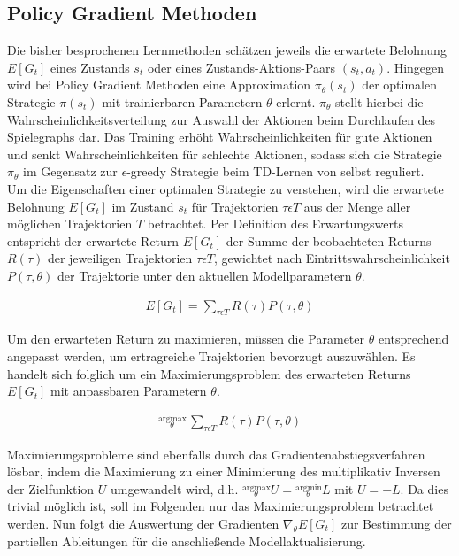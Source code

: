 \subsection{Policy Gradient Methoden}
Die bisher besprochenen Lernmethoden schätzen jeweils die erwartete Belohnung $E[G_t]$
eines Zustands $s_t$ oder eines Zustands-Aktions-Paars $(s_t, a_t)$. Hingegen wird bei
Policy Gradient Methoden eine Approximation $\pi_\theta(s_t)$ der optimalen Strategie
$\pi(s_t)$ mit trainierbaren Parametern $\theta$ erlernt. $\pi_\theta$ stellt hierbei
die Wahrscheinlichkeitsverteilung zur Auswahl der Aktionen beim Durchlaufen des
Spielegraphs dar. Das Training erhöht Wahrscheinlichkeiten für gute Aktionen und
senkt Wahrscheinlichkeiten für schlechte Aktionen, sodass sich die Strategie $\pi_\theta$
im Gegensatz zur $\epsilon$-greedy Strategie beim TD-Lernen von selbst reguliert.\\

Um die Eigenschaften einer optimalen Strategie zu verstehen, wird die erwartete
Belohnung $E[G_t]$ im Zustand $s_t$ für Trajektorien $\tau \epsilon T$ aus der Menge
aller möglichen Trajektorien $T$ betrachtet. Per Definition des Erwartungswerts
entspricht der erwartete Return $E[G_t]$ der Summe der beobachteten Returns $R(\tau)$ der
jeweiligen Trajektorien $\tau \epsilon T$, gewichtet nach Eintrittswahrscheinlichkeit
$P(\tau, \theta)$ der Trajektorie unter den aktuellen Modellparametern $\theta$.

\begin{equation}
\begin{aligned}
E[G_t] = \sum_{\tau \epsilon T} R(\tau) P(\tau, \theta)
\end{aligned}
\end{equation}

Um den erwarteten Return zu maximieren, müssen die Parameter $\theta$ entsprechend
angepasst werden, um ertragreiche Trajektorien bevorzugt auszuwählen. Es handelt sich
folglich um ein Maximierungsproblem des erwarteten Returns $E[G_t]$ mit anpassbaren
Parametern $\theta$.

\begin{equation}
\begin{aligned}
\stackrel{\text{argmax}}{{}_\theta} \, \sum_{\tau \epsilon T} R(\tau) P(\tau, \theta)
\end{aligned}
\end{equation}

Maximierungsprobleme sind ebenfalls durch das Gradientenabstiegsverfahren lösbar, indem
die Maximierung zu einer Minimierung des multiplikativ Inversen der Zielfunktion $U$
umgewandelt wird, d.h. $\stackrel{\text{argmax}}{{}_\theta} U = \stackrel{\text{argmin}}{{}_\theta} L$
mit $U = -L$. Da dies trivial möglich ist, soll im Folgenden nur das Maximierungsproblem
betrachtet werden. Nun folgt die Auswertung der Gradienten $\nabla_\theta E[G_t]$ zur Bestimmung
der partiellen Ableitungen für die anschließende Modellaktualisierung.


